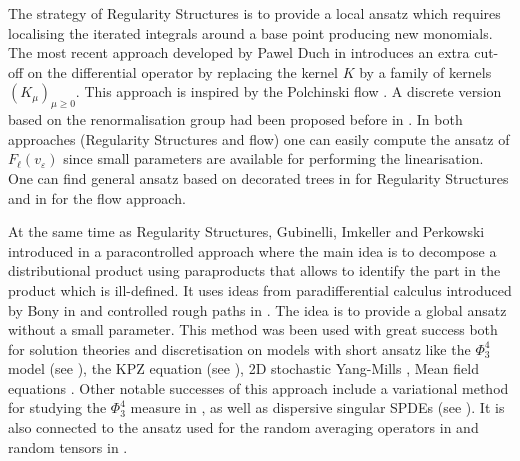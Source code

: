 \documentclass[11pt]{preprint}
\def\eps{\varepsilon}
\let\eps\varepsilon
\begin{document}
	The strategy of Regularity Structures is to provide a local ansatz which requires localising the iterated integrals around a base point producing new monomials. The most recent approach developed by Pawel Duch in \cite{Duc21} introduces an extra cut-off on the differential operator by replacing the kernel $K$ by a family of kernels $ (K_{\mu})_{\mu \geq 0} $. This approach is inspired by the Polchinski flow \cite{P84}. A discrete version based on the renormalisation group had been proposed before in \cite{K16}. In both approaches (Regularity Structures and flow) one can easily compute the ansatz of $F_{\ell}(v_{\eps})$
since small parameters are available for performing the linearisation. One can find general ansatz based on decorated trees in \cite{BCCH} for Regularity Structures and in \cite{BM26} for the flow approach.
	
	At the same time as Regularity Structures, Gubinelli, Imkeller and Perkowski introduced in \cite{GIP} a paracontrolled approach where the main idea is to decompose a distributional product using paraproducts that allows to identify the part in the product which is ill-defined. It uses ideas from paradifferential calculus introduced by Bony in  \cite{Bon81} and controlled rough paths in \cite{Gubinelli2004}.  The idea is to provide a global ansatz without a small parameter. This method was been used with great success both for solution theories and discretisation on models with short ansatz like the $\Phi^4_3$ model (see \cite{Phi43Paracontrol,MW17,MWX17,ZZ18,GH19,JP23,BDFT23}), the KPZ equation (see \cite{KPZReloaded}), 2D stochastic Yang-Mills \cite{BC23}, Mean field equations \cite{Meanfield}. 
	Other notable successes of this approach include a variational method for studying the $ \Phi_3^4 $ measure in \cite{BG20}, as well as dispersive singular SPDEs (see \cite{GKO24,BDNY24}). It is also connected to the ansatz used for the random averaging operators in \cite{DNY24} and random tensors in \cite{DNY22}.
	
\end{document}
